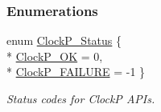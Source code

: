 \subsubsection*{Enumerations}
\begin{DoxyCompactItemize}
\item 
enum \hyperlink{_clock_p_8h_aa2030f172fe0c2dbc9ac0b082933c767}{Clock\+P\+\_\+\+Status} \{ \\*
\hyperlink{_clock_p_8h_aa2030f172fe0c2dbc9ac0b082933c767a300c7c353a0ae1d107c2b2278a40a09b}{Clock\+P\+\_\+\+O\+K} = 0, 
\\*
\hyperlink{_clock_p_8h_aa2030f172fe0c2dbc9ac0b082933c767a2033a09c166a62496eeb184d0c736a67}{Clock\+P\+\_\+\+F\+A\+I\+L\+U\+R\+E} = -\/1
 \}
\begin{DoxyCompactList}\small\item\em Status codes for Clock\+P A\+P\+Is. \end{DoxyCompactList}\end{DoxyCompactItemize}
